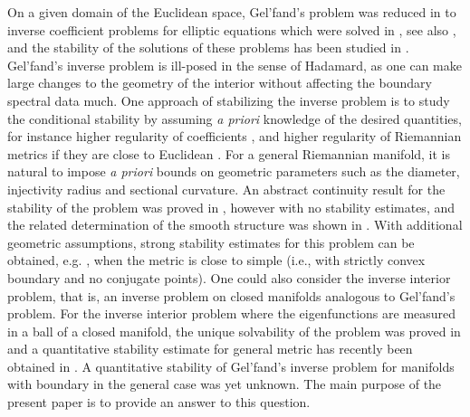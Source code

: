 \documentclass[11pt,letterpaper]{amsart}
\numberwithin{equation}{section}
\theoremstyle{definition}
\theoremstyle{plain}
\theoremstyle{definition}
\theoremstyle{plain}
\theoremstyle{definition}
\theoremstyle{plain}
\begin{document}
On a given domain of the Euclidean space, Gel'fand's problem was reduced in \cite{NSU} to inverse coefficient problems for elliptic
equations which were solved in \cite{Astala,Nachman1,Nachman2,SyUl}, see also \cite{DosSantos,Guillarmou,Isozaki,KenigSalo,KSU,U}, and the stability of the solutions of these problems has been studied in \cite{A,AlS,SyUl2}.    
Gel'fand's inverse problem is ill-posed in the sense of Hadamard, as one can make large changes to the geometry of the interior without affecting the boundary spectral data much. One approach of stabilizing the inverse problem is to study the conditional stability by assuming \emph{a priori} knowledge of the desired quantities, for instance higher regularity of coefficients \cite{A}, and higher regularity of Riemannian metrics if they are close to Euclidean \cite{SU}. For a general Riemannian manifold, it is natural to impose \emph{a priori} bounds on geometric parameters such as the diameter, injectivity radius and sectional curvature. An abstract continuity result for the stability of the problem was proved in \cite{AKKLT}, however with no stability estimates, and the related determination of the smooth structure was shown in \cite{FIKLN}.
With additional geometric assumptions, strong stability estimates for this problem can be obtained, e.g. \cite{BD,SU2}, when the metric is close to simple (i.e., with strictly convex boundary and no conjugate points).
One could also consider the inverse interior problem, that is, an inverse problem on closed manifolds analogous to Gel'fand's problem. For the inverse interior problem where the eigenfunctions are measured in a ball of a closed manifold, the unique solvability of the problem was proved in \cite{KrKL} and a quantitative stability estimate for general metric has recently been obtained in \cite{BKL3}. 
A quantitative stability of Gel'fand's inverse problem for manifolds with boundary in the general case was yet unknown. 
The main purpose of the present paper is to provide an answer to this question.
\end{document}
